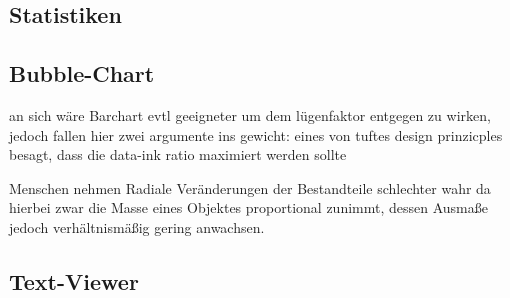 \subsection{Statistiken}


\subsection{Bubble-Chart}
an sich wäre Barchart evtl geeigneter um dem lügenfaktor entgegen zu wirken, jedoch fallen hier zwei argumente ins gewicht: eines von tuftes design prinzicples besagt, dass die data-ink ratio maximiert werden sollte

Menschen nehmen Radiale Ver\"anderungen der Bestandteile schlechter wahr da hierbei zwar die Masse eines Objektes proportional zunimmt, dessen Ausma{\ss}e jedoch verh\"altnism\"a{\ss}ig gering anwachsen.

\subsection{Text-Viewer}